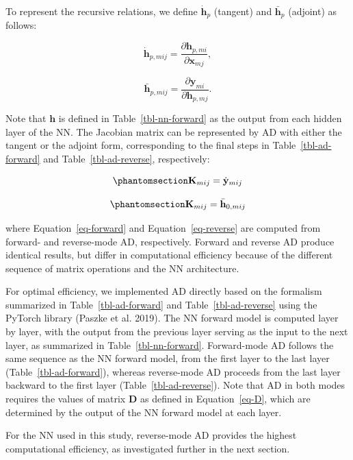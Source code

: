 \documentclass[
  letterpaper,
  open=any]{scrbook}
\begin{document}
To represent the recursive relations, we define \(\dot{\mathbf{h}}_p\)
(tangent) and \(\bar{\mathbf{h}}_p\) (adjoint) as follows:

\[
\dot{\mathbf{h}}_{p,mij}
=
\frac{\partial \mathbf{h}_{p,mi}}
{\partial \mathbf{x}_{mj}},
\]

\[
\bar{\mathbf{h}}_{p,mij}
=
\frac{\partial \mathbf{y}_{mi}}
{\partial \mathbf{h}_{p,mj}}.
\]

Note that \(\mathbf{h}\) is defined in Table~\ref{tbl-nn-forward} as the
output from each hidden layer of the NN. The Jacobian matrix can be
represented by AD with either the tangent or the adjoint form,
corresponding to the final steps in Table~\ref{tbl-ad-forward} and
Table~\ref{tbl-ad-reverse}, respectively:

\begin{equation}\phantomsection\label{eq-forward}{
\mathbf{K}_{mij}
=
\dot{\mathbf{y}}_{mij}
}\end{equation}

\begin{equation}\phantomsection\label{eq-reverse}{
\mathbf{K}_{mij}
=
\bar{\mathbf{h}}_{0,mij}
}\end{equation}

where Equation~\ref{eq-forward} and Equation~\ref{eq-reverse} are
computed from forward- and reverse-mode AD, respectively. Forward and
reverse AD produce identical results, but differ in computational
efficiency because of the different sequence of matrix operations and
the NN architecture.

For optimal efficiency, we implemented AD directly based on the
formalism summarized in Table~\ref{tbl-ad-forward} and
Table~\ref{tbl-ad-reverse} using the PyTorch library (Paszke et al.
2019). The NN forward model is computed layer by layer, with the output
from the previous layer serving as the input to the next layer, as
summarized in Table~\ref{tbl-nn-forward}. Forward-mode AD follows the
same sequence as the NN forward model, from the first layer to the last
layer (Table~\ref{tbl-ad-forward}), whereas reverse-mode AD proceeds
from the last layer backward to the first layer
(Table~\ref{tbl-ad-reverse}). Note that AD in both modes requires the
values of matrix \(\mathbf{D}\) as defined in Equation~\ref{eq-D}, which
are determined by the output of the NN forward model at each layer.

For the NN used in this study, reverse-mode AD provides the highest
computational efficiency, as investigated further in the next section.
\end{document}
